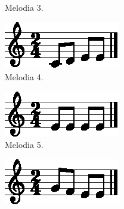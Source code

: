 \begin{figure}[!h]
\begin{subfigure}[b]{0.3\textwidth}
         \caption{Melodia 3.}
         \label{fig:melodia-chars-shape-3-1}
     \end{subfigure}
     \hfill
     \begin{subfigure}[b]{0.3\textwidth}
         \centering
         \includegraphics[width=\textwidth]{chapters/cap-musicalidade-percepcion/melodia-chars-shape-4-1.eps}
         \caption{Melodia 4.}
         \label{fig:melodia-chars-shape-4-1}
     \end{subfigure}
     \hfill
     \begin{subfigure}[b]{0.3\textwidth}
         \centering
         \includegraphics[width=\textwidth]{chapters/cap-musicalidade-percepcion/melodia-chars-shape-5-1.eps}
         \caption{Melodia 5.}
         \label{fig:melodia-chars-shape-5-1}
     \end{subfigure}
     \hfill
     \begin{subfigure}[b]{0.3\textwidth}
         \centering
         \includegraphics[width=\textwidth]{chapters/cap-musicalidade-percepcion/melodia-chars-shape-6-1.eps}

\end{subfigure}
\end{figure}
